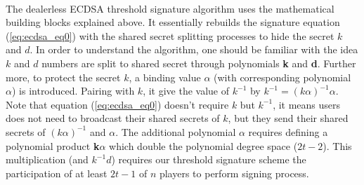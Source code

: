 \documentclass[a4paper,10pt]{article}
\begin{document}
\paragraph{} The dealerless ECDSA threshold signature algorithm uses the mathematical building blocks explained above. It essentially rebuilds the signature equation (\ref{eq:ecdsa_eq0}) with the shared secret splitting processes to hide the secret $k$ and $d$. In order to understand the algorithm, one should be familiar with the idea $k$ and $d$ numbers are split to shared secret through polynomials \textbf{k} and \textbf{d}. Further more, to protect the secret $k$, a binding value $\alpha$ (with corresponding polynomial {\boldmath$\alpha$}) is introduced. Pairing with $k$, it give the value of $k^{-1}$ by $k^{-1} = (k\alpha)^{-1}\alpha$. Note that equation (\ref{eq:ecdsa_eq0}) doesn't require $k$ but $k^{-1}$, it means users does not need to broadcast their shared secrets of $k$, but they send their shared secrets of $(k\alpha)^{-1}$ and $\alpha$. The additional polynomial {\boldmath$\alpha$} requires defining a polynomial product \textbf{k}{\boldmath$\alpha$} which double the polynomial degree space ($2t-2$). This multiplication (and $k^{-1}d$) requires our threshold signature scheme the participation of at least $2t-1$ of $n$ players to perform signing process.
\end{document}
